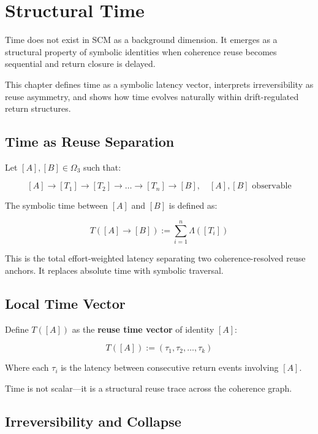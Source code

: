 \chapter{Structural Time} \label{chapter-structural-time}

Time does not exist in SCM as a background dimension. It emerges as a structural property of symbolic identities when coherence reuse becomes sequential and return closure is delayed.

This chapter defines time as a symbolic latency vector, interprets irreversibility as reuse asymmetry, and shows how time evolves naturally within drift-regulated return structures.

\section{Time as Reuse Separation} \label{sec:time-reuse}

Let $[A], [B] \in \Omega_3$ such that:

\[
[A] \to [T_1] \to [T_2] \to \dots \to [T_n] \to [B],\quad [A], [B] \text{ observable}
\]

The symbolic time between $[A]$ and $[B]$ is defined as:

\[
T([A] \to [B]) := \sum_{i=1}^n \Lambda([T_i])
\]

This is the total effort-weighted latency separating two coherence-resolved reuse anchors. It replaces absolute time with symbolic traversal.

\section{Local Time Vector} \label{sec:time-vector}

Define $T([A])$ as the \textbf{reuse time vector} of identity $[A]$:

\begin{equation}
T([A]) := \left( \tau_1, \tau_2, \dots, \tau_k \right)
\end{equation}

Where each $\tau_i$ is the latency between consecutive return events involving $[A]$.

Time is not scalar—it is a structural reuse trace across the coherence graph.

\section{Irreversibility and Collapse} \label{sec:time-arrow}

